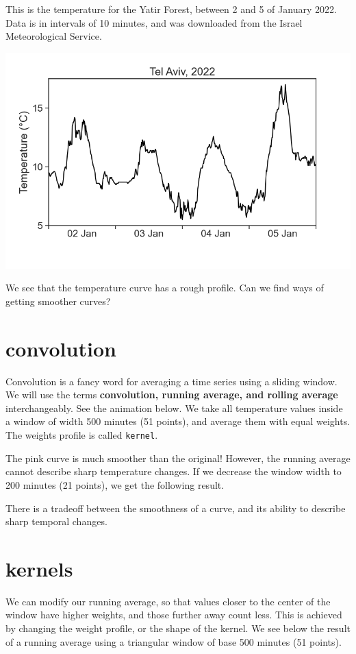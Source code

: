 \documentclass[
  letterpaper,
  DIV=11,
  numbers=noendperiod,
  oneside]{scrreprt}
\begin{document}
This is the temperature for the Yatir Forest, between 2 and 5 of January
2022. Data is in intervals of 10 minutes, and was downloaded from the
Israel Meteorological Service.

\includegraphics{smoothing/convolution_TA_temperature_2022.png}

We see that the temperature curve has a rough profile. Can we find ways
of getting smoother curves?

\hypertarget{convolution}{%
\section{convolution}\label{convolution}}

Convolution is a fancy word for averaging a time series using a sliding
window. We will use the terms \textbf{convolution, running average, and
rolling average} interchangeably. See the animation below. We take all
temperature values inside a window of width 500 minutes (51 points), and
average them with equal weights. The weights profile is called
\texttt{kernel}.

The pink curve is much smoother than the original! However, the running
average cannot describe sharp temperature changes. If we decrease the
window width to 200 minutes (21 points), we get the following result.

There is a tradeoff between the smoothness of a curve, and its ability
to describe sharp temporal changes.

\hypertarget{kernels}{%
\section{kernels}\label{kernels}}

We can modify our running average, so that values closer to the center
of the window have higher weights, and those further away count less.
This is achieved by changing the weight profile, or the shape of the
kernel. We see below the result of a running average using a triangular
window of base 500 minutes (51 points).
\end{document}
